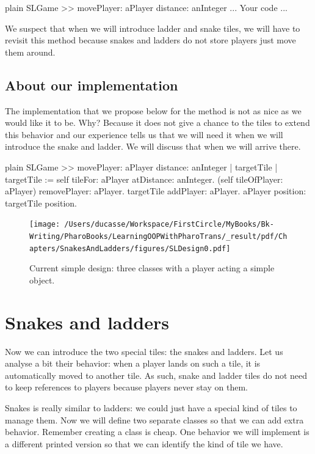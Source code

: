 \documentclass[10pt,twoside,english]{_support/latex/sbabook/sbabook}
\begin{document}
\begin{displaycode}{plain}
SLGame >> movePlayer: aPlayer distance: anInteger
	... Your code ...
\end{displaycode}

We suspect that when we will introduce ladder and snake tiles, we will have to revisit this method because snakes and ladders do not store players just move them around.
\subsection{About our implementation}
The implementation  that we propose below for the  method  is not as nice as we would like it to be. Why? Because it does not give a chance to the tiles to extend this behavior and our experience tells us that we will need it when we will introduce the snake and ladder. We will discuss that when we will arrive there. 

\begin{displaycode}{plain}
SLGame >> movePlayer: aPlayer distance: anInteger 
	| targetTile |
	targetTile := self tileFor: aPlayer atDistance: anInteger.
	(self tileOfPlayer: aPlayer) removePlayer: aPlayer.
	targetTile addPlayer: aPlayer.
	aPlayer position: targetTile position.
\end{displaycode}


\begin{figure}

\begin{center}
\texttt{[image: /Users/ducasse/Workspace/FirstCircle/MyBooks/Bk-Writing/PharoBooks/LearningOOPWithPharoTrans/\_result/pdf/Chapters/SnakesAndLadders/figures/SLDesign0.pdf]}\caption{Current simple design: three classes with a player acting a simple object.\label{fig:sldesign0}}\end{center}
\end{figure}

\section{Snakes and ladders}
Now we can introduce the two special tiles: the snakes and ladders. 
Let us analyse a bit their behavior: when a player lands on such a tile, it is automatically moved to another tile. As such, snake and ladder tiles do not need to keep references to players because players never stay on them. 

Snakes is really similar to ladders: we could just have a special kind of tiles to manage them. 
Now we will define two separate classes so that we can add extra behavior. Remember creating a class is cheap. One behavior we will implement is a different printed version so that we can identify the kind of tile we have.
\end{document}
